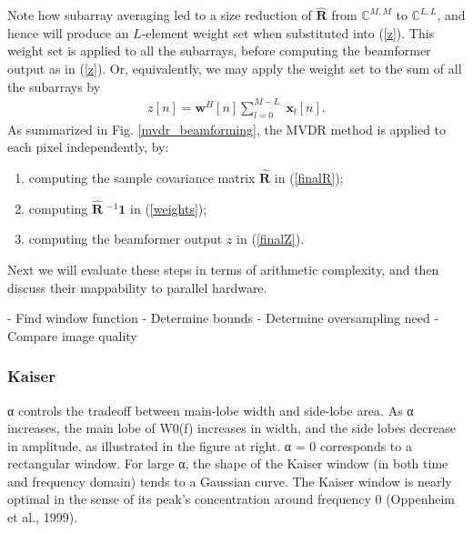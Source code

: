 \documentclass[10pt,journal,draftclsnofoot,onecolumn]{IEEEtran}
\let\MYoriglatexcaption\caption               %
\renewcommand{\caption}[2][\relax]{\MYoriglatexcaption[#2]{#2}}
\newcommand\sumb[2]{\sum\limits_{#1}^{#2}\;}
\renewcommand\H{^{\scriptscriptstyle H}}
\renewcommand\vec[1]{\boldsymbol{#1}}
\newcommand\mat[1]{\boldsymbol{#1}}
\newcommand\1{\vec 1}
\newcommand*\w{\vec w}
\newcommand*\x{\vec x}
\newcommand*\eR{\mat{\hat R}}
\newcommand*\eRi{\hat{\mat R}\;\!^{-1}}
\begin{document}
Note how subarray averaging led to a size reduction of $\eR$ from $\mathbb{C}^{M,M}$ to $\mathbb{C}^{L,L}$, and hence will produce an $L$-element weight set when substituted into (\ref{z}). This weight set is applied to all the subarrays, before computing the beamformer output as in (\ref{z}). Or, equivalently, we may apply the weight set to the sum of all the subarrays by
\begin{align}
z[n] = \w\H[n] \sumb{l=0}{M-L} \x_l[n].\label{finalZ}
\end{align}
As summarized in Fig. \ref{mvdr_beamforming}, the MVDR method is applied to each pixel independently, by:
\begin{enumerate}
\item computing the sample covariance matrix $\eR$ in (\ref{finalR});
\item computing $\eRi\1$ in (\ref{weights});
\item computing the beamformer output $z$ in (\ref{finalZ}).
\end{enumerate}
Next we will evaluate these steps in terms of arithmetic complexity, and then discuss their mappability to parallel hardware.




- Find window function
- Determine bounds
- Determine oversampling need
- Compare image quality





\subsubsection{Kaiser}

α controls the tradeoff between main-lobe width and side-lobe area.  As α increases, the main lobe of W0(f) increases in width, and the side lobes decrease in amplitude, as illustrated in the figure at right.  α = 0 corresponds to a rectangular window. For large α, the shape of the Kaiser window (in both time and frequency domain) tends to a Gaussian curve.  The Kaiser window is nearly optimal in the sense of its peak's concentration around frequency 0 (Oppenheim et al., 1999).
\end{document}
